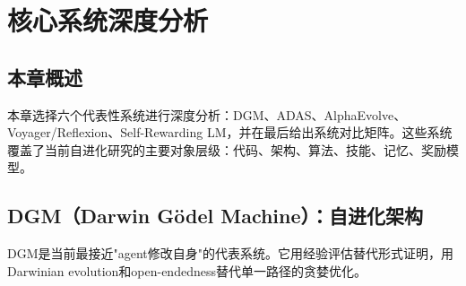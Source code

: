 
\section{核心系统深度分析}\label{ch:systems}

\subsection{本章概述}

本章选择六个代表性系统进行深度分析：DGM、ADAS、AlphaEvolve、Voyager/Reflexion、Self-Rewarding LM，并在最后给出系统对比矩阵。这些系统覆盖了当前自进化研究的主要对象层级：代码、架构、算法、技能、记忆、奖励模型。

\subsection{DGM（Darwin Gödel Machine）：自进化架构}

DGM是当前最接近"agent修改自身"的代表系统。它用经验评估替代形式证明，用Darwinian evolution和open-endedness替代单一路径的贪婪优化。

